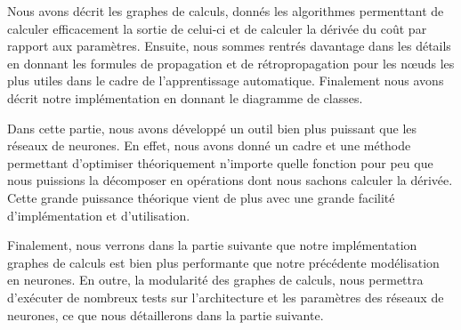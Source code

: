 Nous avons décrit les graphes de calculs, donnés les algorithmes permenttant de calculer efficacement la sortie de celui-ci et de calculer la dérivée du coût par rapport aux paramètres. Ensuite, nous sommes rentrés davantage dans les détails en donnant les formules de propagation et de rétropropagation pour les n\oe{}uds les plus utiles dans le cadre de l'apprentissage automatique. Finalement nous avons décrit notre implémentation en donnant le diagramme de classes.

Dans cette partie, nous avons développé un outil bien plus puissant que les réseaux de neurones. En effet, nous avons donné un cadre et une méthode permettant d'optimiser théoriquement n'importe quelle fonction pour peu que nous puissions la décomposer en opérations dont nous sachons calculer la dérivée. Cette grande puissance théorique vient de plus avec une grande facilité d'implémentation et d'utilisation.

Finalement, nous verrons dans la partie suivante que notre implémentation graphes de calculs est bien plus performante que notre précédente modélisation en neurones. En outre, la modularité des graphes de calculs, nous permettra d'exécuter de nombreux tests sur l'architecture et les paramètres des réseaux de neurones, ce que nous détaillerons dans la partie suivante.